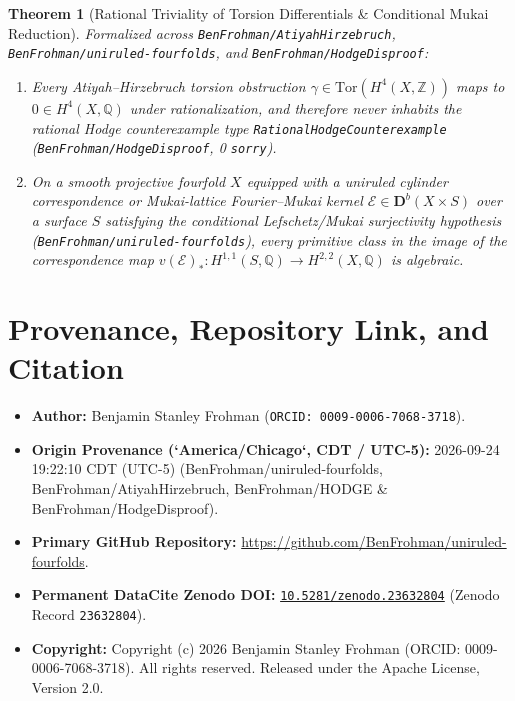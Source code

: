 \documentclass[11pt,letterpaper]{article}
\newtheorem{theorem}{Theorem}
\begin{document}
\begin{theorem}[Rational Triviality of Torsion Differentials \& Conditional Mukai Reduction]
Formalized across \texttt{BenFrohman/AtiyahHirzebruch}, \texttt{BenFrohman/uniruled-fourfolds}, and \texttt{BenFrohman/HodgeDisproof}:
\begin{enumerate}[leftmargin=2em]
  \item Every Atiyah--Hirzebruch torsion obstruction $\gamma \in \mathrm{Tor}(H^4(X,\mathbb{Z}))$ maps to $0 \in H^4(X,\mathbb{Q})$ under rationalization, and therefore never inhabits the rational Hodge counterexample type \texttt{RationalHodgeCounterexample} (\texttt{BenFrohman/HodgeDisproof}, 0 \texttt{sorry}).
  \item On a smooth projective fourfold $X$ equipped with a uniruled cylinder correspondence or Mukai-lattice Fourier--Mukai kernel $\mathcal{E} \in \mathbf{D}^b(X \times S)$ over a surface $S$ satisfying the conditional Lefschetz/Mukai surjectivity hypothesis (\texttt{BenFrohman/uniruled-fourfolds}), every primitive class in the image of the correspondence map $v(\mathcal{E})_* : H^{1,1}(S,\mathbb{Q}) \to H^{2,2}(X,\mathbb{Q})$ is algebraic.
\end{enumerate}
\end{theorem}


\section*{Provenance, Repository Link, and Citation}
\begin{itemize}[leftmargin=2em]
  \item \textbf{Author:} Benjamin Stanley Frohman (\texttt{ORCID: 0009-0006-7068-3718}).
  \item \textbf{Origin Provenance (`America/Chicago`, CDT / UTC-5):} 2026-09-24 19:22:10 CDT (UTC-5) (BenFrohman/uniruled-fourfolds, BenFrohman/AtiyahHirzebruch, BenFrohman/HODGE \& BenFrohman/HodgeDisproof).
  \item \textbf{Primary GitHub Repository:} \url{https://github.com/BenFrohman/uniruled-fourfolds}.
  \item \textbf{Permanent DataCite Zenodo DOI:} \href{https://doi.org/10.5281/zenodo.23632804}{\texttt{10.5281/zenodo.23632804}} (Zenodo Record \texttt{23632804}).
  \item \textbf{Copyright:} Copyright (c) 2026 Benjamin Stanley Frohman (ORCID: 0009-0006-7068-3718). All rights reserved. Released under the Apache License, Version 2.0.
\end{itemize}
\end{document}
